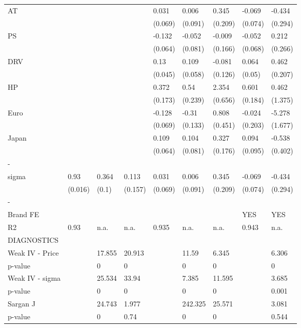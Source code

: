 \documentclass{article}\usepackage[]{graphicx}\usepackage[]{color}
\begin{document}
\begin{table}[ht]
\begin{tabular}{lllllllll}
  AT &  &  &  & 0.031 & 0.006 & 0.345 & -0.069 & -0.434 \\ 
   &  &  &  & (0.069) & (0.091) & (0.209) & (0.074) & (0.294) \\ 
  PS &  &  &  & -0.132 & -0.052 & -0.009 & -0.052 & 0.212 \\ 
   &  &  &  & (0.064) & (0.081) & (0.166) & (0.068) & (0.266) \\ 
  DRV &  &  &  & 0.13 & 0.109 & -0.081 & 0.064 & 0.462 \\ 
   &  &  &  & (0.045) & (0.058) & (0.126) & (0.05) & (0.207) \\ 
  HP &  &  &  & 0.372 & 0.54 & 2.354 & 0.601 & 0.462 \\ 
   &  &  &  & (0.173) & (0.239) & (0.656) & (0.184) & (1.375) \\ 
  Euro &  &  &  & -0.128 & -0.31 & 0.808 & -0.024 & -5.278 \\ 
   &  &  &  & (0.069) & (0.133) & (0.451) & (0.203) & (1.677) \\ 
  Japan &  &  &  & 0.109 & 0.104 & 0.327 & 0.094 & -0.538 \\ 
   &  &  &  & (0.064) & (0.081) & (0.176) & (0.095) & (0.402) \\ 
  - &  &  &  &  &  &  &  &  \\ 
  sigma & 0.93 & 0.364 & 0.113 & 0.031 & 0.006 & 0.345 & -0.069 & -0.434 \\ 
   & (0.016) & (0.1) & (0.157) & (0.069) & (0.091) & (0.209) & (0.074) & (0.294) \\ 
  - &  &  &  &  &  &  &  &  \\ 
  Brand FE &  &  &  &  &  &  & YES & YES \\ 
  R2 & 0.93 & n.a. & n.a. & 0.935 & n.a. & n.a. & 0.943 & n.a. \\ 
   DIAGNOSTICS  &  &  &  &  &  &  &  &  \\ 
  Weak IV - Price &  & 17.855 & 20.913 &  & 11.59 & 6.345 &  & 6.306 \\ 
  p-value &  & 0 & 0 &  & 0 & 0 &  & 0 \\ 
  Weak IV - sigma &  & 25.534 & 33.94 &  & 7.385 & 11.595 &  & 3.685 \\ 
  p-value &  & 0 & 0 &  & 0 & 0 &  & 0.001 \\ 
  Sargan J &  & 24.743 & 1.977 &  & 242.325 & 25.571 &  & 3.081 \\ 
  p-value &  & 0 & 0.74 &  & 0 & 0 &  & 0.544 \\ 
   \bottomrule 
\end{tabular}
\endgroup
\end{table}
\end{document}
